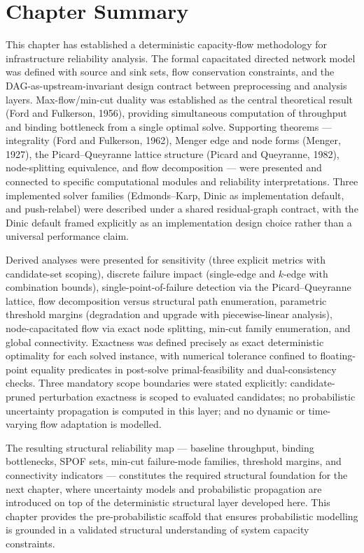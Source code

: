 \documentclass[12pt]{report}
\begin{document}
\section{Chapter Summary}

This chapter has established a deterministic capacity-flow methodology for infrastructure reliability analysis. The formal capacitated directed network model was defined with source and sink sets, flow conservation constraints, and the DAG-as-upstream-invariant design contract between preprocessing and analysis layers. Max-flow/min-cut duality was established as the central theoretical result (Ford and Fulkerson, 1956), providing simultaneous computation of throughput and binding bottleneck from a single optimal solve. Supporting theorems --- integrality (Ford and Fulkerson, 1962), Menger edge and node forms (Menger, 1927), the Picard--Queyranne lattice structure (Picard and Queyranne, 1982), node-splitting equivalence, and flow decomposition --- were presented and connected to specific computational modules and reliability interpretations. Three implemented solver families (Edmonds--Karp, Dinic as implementation default, and push-relabel) were described under a shared residual-graph contract, with the Dinic default framed explicitly as an implementation design choice rather than a universal performance claim.

Derived analyses were presented for sensitivity (three explicit metrics with candidate-set scoping), discrete failure impact (single-edge and $k$-edge with combination bounds), single-point-of-failure detection via the Picard--Queyranne lattice, flow decomposition versus structural path enumeration, parametric threshold margins (degradation and upgrade with piecewise-linear analysis), node-capacitated flow via exact node splitting, min-cut family enumeration, and global connectivity. Exactness was defined precisely as exact deterministic optimality for each solved instance, with numerical tolerance confined to floating-point equality predicates in post-solve primal-feasibility and dual-consistency checks. Three mandatory scope boundaries were stated explicitly: candidate-pruned perturbation exactness is scoped to evaluated candidates; no probabilistic uncertainty propagation is computed in this layer; and no dynamic or time-varying flow adaptation is modelled.

The resulting structural reliability map --- baseline throughput, binding bottlenecks, SPOF sets, min-cut failure-mode families, threshold margins, and connectivity indicators --- constitutes the required structural foundation for the next chapter, where uncertainty models and probabilistic propagation are introduced on top of the deterministic structural layer developed here. This chapter provides the pre-probabilistic scaffold that ensures probabilistic modelling is grounded in a validated structural understanding of system capacity constraints.
\end{document}
